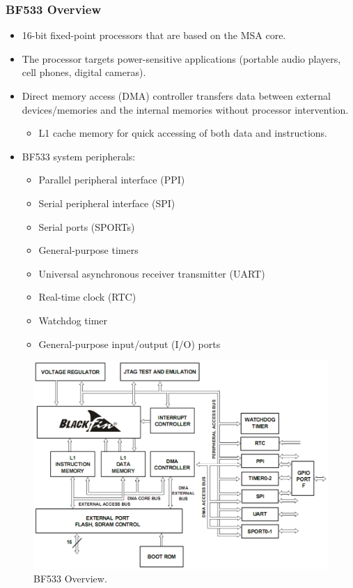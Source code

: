 \subsubsection{BF533 Overview}
\begin{itemize}
	\item 16-bit fixed-point processors	that are based on the MSA core.
	\item The processor targets power-sensitive applications (portable audio players, cell phones, digital cameras).
	\item Direct memory access (DMA) controller transfers data between external devices/memories and the internal memories without processor intervention.
	\begin{itemize}
		\item L1 cache memory for quick accessing of both data and instructions.
	\end{itemize}
	\item BF533 system peripherals:
	\begin{itemize}
		\item Parallel peripheral interface	(PPI)
		\item Serial peripheral interface (SPI)
		\item Serial ports (SPORTs)
		\item General-purpose timers
		\item Universal asynchronous receiver transmitter (UART)
		\item Real-time clock (RTC)
		\item Watchdog timer
		\item General-purpose input/output (I/O) ports
	\end{itemize}
\end{itemize}
\begin{figure} [H]
	\centering
	\includegraphics[width=0.85\linewidth]{graphics/6.png}
	\caption{BF533 Overview.}
	\label{fig:6}
\end{figure}

